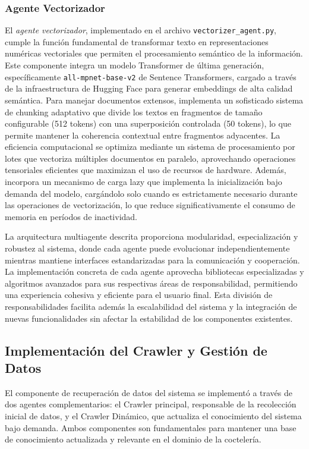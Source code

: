 \documentclass[runningheads]{llncs}
\begin{document}
\subsubsection{Agente Vectorizador}
El \textit{agente vectorizador}, implementado en el archivo \texttt{vectorizer\_agent.py}, cumple la función fundamental de transformar texto en representaciones numéricas vectoriales que permiten el procesamiento semántico de la información. Este componente integra un modelo Transformer de última generación, específicamente \texttt{all-mpnet-base-v2} de Sentence Transformers, cargado a través de la infraestructura de Hugging Face para generar embeddings de alta calidad semántica. Para manejar documentos extensos, implementa un sofisticado sistema de chunking adaptativo que divide los textos en fragmentos de tamaño configurable (512 tokens) con una superposición controlada (50 tokens), lo que permite mantener la coherencia contextual entre fragmentos adyacentes. La eficiencia computacional se optimiza mediante un sistema de procesamiento por lotes que vectoriza múltiples documentos en paralelo, aprovechando operaciones tensoriales eficientes que maximizan el uso de recursos de hardware. Además, incorpora un mecanismo de carga lazy que implementa la inicialización bajo demanda del modelo, cargándolo solo cuando es estrictamente necesario durante las operaciones de vectorización, lo que reduce significativamente el consumo de memoria en períodos de inactividad.

La arquitectura multiagente descrita proporciona modularidad, especialización y robustez al sistema, donde cada agente puede evolucionar independientemente mientras mantiene interfaces estandarizadas para la comunicación y cooperación. La implementación concreta de cada agente aprovecha bibliotecas especializadas y algoritmos avanzados para sus respectivas áreas de responsabilidad, permitiendo una experiencia cohesiva y eficiente para el usuario final. Esta división de responsabilidades facilita además la escalabilidad del sistema y la integración de nuevas funcionalidades sin afectar la estabilidad de los componentes existentes.

\subsection{Implementación del Crawler y Gestión de Datos}

El componente de recuperación de datos del sistema se implementó a través de dos agentes complementarios: el Crawler principal, responsable de la recolección inicial de datos, y el Crawler Dinámico, que actualiza el conocimiento del sistema bajo demanda. Ambos componentes son fundamentales para mantener una base de conocimiento actualizada y relevante en el dominio de la coctelería.
\end{document}

